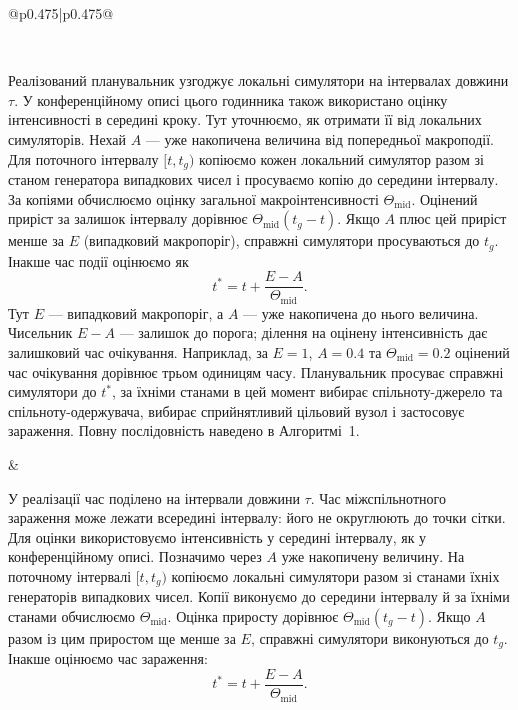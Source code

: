 \documentclass[11pt]{article}
\begin{document}
\begin{longtable}{@{}p{0.475\textwidth}|p{0.475\textwidth}@{}}
\begin{minipage}[t]{\linewidth}
\end{minipage} \\[5mm]
\begin{minipage}[t]{\linewidth}
Реалізований планувальник узгоджує локальні симулятори на інтервалах довжини $\tau$. У конференційному описі цього годинника також використано оцінку інтенсивності в середині кроку. Тут уточнюємо, як отримати її від локальних симуляторів. Нехай $A$ --- уже накопичена величина від попередньої макроподії. Для поточного інтервалу $[t,t_g)$ копіюємо кожен локальний симулятор разом зі станом генератора випадкових чисел і просуваємо копію до середини інтервалу. За копіями обчислюємо оцінку загальної макроінтенсивності $\Theta_{\mathrm{mid}}$. Оцінений приріст за залишок інтервалу дорівнює $\Theta_{\mathrm{mid}}(t_g-t)$. Якщо $A$ плюс цей приріст менше за $E$ (випадковий макропоріг), справжні симулятори просуваються до $t_g$. Інакше час події оцінюємо як
\begin{equation*}t^\ast=t+\frac{E-A}{\Theta_{\mathrm{mid}}}.\tag{6}
\end{equation*}
Тут $E$ --- випадковий макропоріг, а $A$ --- уже накопичена до нього величина. Чисельник $E-A$ --- залишок до порога; ділення на оцінену інтенсивність дає залишковий час очікування. Наприклад, за $E=1$, $A=0.4$ та $\Theta_{\mathrm{mid}}=0.2$ оцінений час очікування дорівнює трьом одиницям часу. Планувальник просуває справжні симулятори до $t^\ast$, за їхніми станами в цей момент вибирає спільноту-джерело та спільноту-одержувача, вибирає сприйнятливий цільовий вузол і застосовує зараження. Повну послідовність наведено в Алгоритмі~1.
\end{minipage} &
\begin{minipage}[t]{\linewidth}
У реалізації час поділено на інтервали довжини $\tau$. Час міжспільнотного зараження може лежати всередині інтервалу: його не округлюють до точки сітки. Для оцінки використовуємо інтенсивність у середині інтервалу, як у конференційному описі. Позначимо через $A$ уже накопичену величину. На поточному інтервалі $[t,t_g)$ копіюємо локальні симулятори разом зі станами їхніх генераторів випадкових чисел. Копії виконуємо до середини інтервалу й за їхніми станами обчислюємо $\Theta_{\mathrm{mid}}$. Оцінка приросту дорівнює $\Theta_{\mathrm{mid}}(t_g-t)$. Якщо $A$ разом із цим приростом ще менше за $E$, справжні симулятори виконуються до $t_g$. Інакше оцінюємо час зараження:
\begin{equation*}t^\ast=t+\frac{E-A}{\Theta_{\mathrm{mid}}}.\tag{6}
\end{equation*}

\end{minipage}
\end{longtable}
\end{document}

